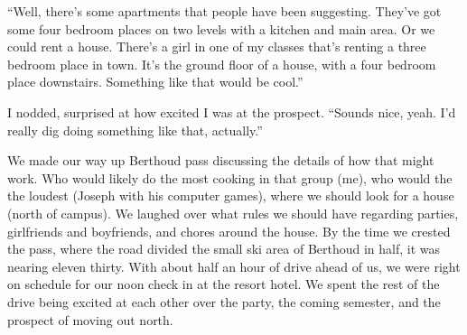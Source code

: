 ``Well, there's some apartments that people have been suggesting.  They've got some four bedroom places on two levels with a kitchen and main area.  Or we could rent a house.  There's a girl in one of my classes that's renting a three bedroom place in town.  It's the ground floor of a house, with a four bedroom place downstairs.  Something like that would be cool.''

I nodded, surprised at how excited I was at the prospect.  ``Sounds nice, yeah.  I'd really dig doing something like that, actually.''

We made our way up Berthoud pass discussing the details of how that might work.  Who would likely do the most cooking in that group (me), who would the the loudest (Joseph with his computer games), where we should look for a house (north of campus).  We laughed over what rules we should have regarding parties, girlfriends and boyfriends, and chores around the house.  By the time we crested the pass, where the road divided the small ski area of Berthoud in half, it was nearing eleven thirty.  With about half an hour of drive ahead of us, we were right on schedule for our noon check in at the resort hotel.  We spent the rest of the drive being excited at each other over the party, the coming semester, and the prospect of moving out north.
